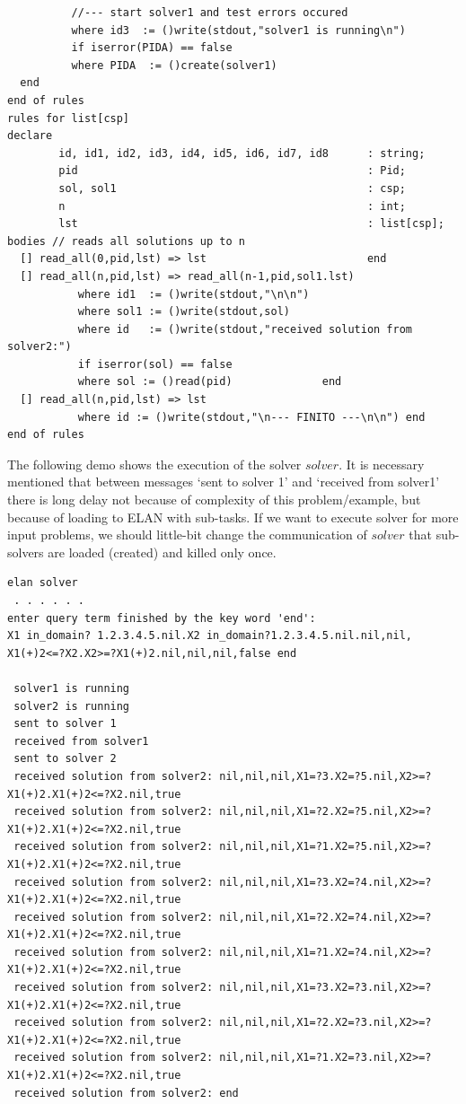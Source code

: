 \documentclass{article}
\begin{document}
{{\begin{verbatim}
          //--- start solver1 and test errors occured
          where id3  := ()write(stdout,"solver1 is running\n")
          if iserror(PIDA) == false 
          where PIDA  := ()create(solver1)              
  end
end of rules
rules for list[csp]
declare 
        id, id1, id2, id3, id4, id5, id6, id7, id8      : string;
        pid                                             : Pid;
        sol, sol1                                       : csp;
        n                                               : int;
        lst                                             : list[csp];
bodies // reads all solutions up to n
  [] read_all(0,pid,lst) => lst                         end
  [] read_all(n,pid,lst) => read_all(n-1,pid,sol1.lst)
           where id1  := ()write(stdout,"\n\n")
           where sol1 := ()write(stdout,sol)
           where id   := ()write(stdout,"received solution from solver2:")
           if iserror(sol) == false
           where sol := ()read(pid)              end
  [] read_all(n,pid,lst) => lst
           where id := ()write(stdout,"\n--- FINITO ---\n\n") end
end of rules
\end{verbatim}
}
%
The following demo shows the execution of the solver $solver$. It is
necessary mentioned that between messages `sent to solver 1' and
`received from solver1' there is long delay  not because of
complexity of this problem/example, but because of loading to ELAN
with sub-tasks. If we want to execute solver for more input problems,
we should little-bit change the communication of $solver$ that
sub-solvers are loaded (created) and killed only once.
{\scriptsize
\begin{verbatim}
elan solver
 . . . . . .
enter query term finished by the key word 'end':
X1 in_domain? 1.2.3.4.5.nil.X2 in_domain?1.2.3.4.5.nil.nil,nil,
X1(+)2<=?X2.X2>=?X1(+)2.nil,nil,nil,false end

 solver1 is running 
 solver2 is running 
 sent to solver 1
 received from solver1 
 sent to solver 2
 received solution from solver2: nil,nil,nil,X1=?3.X2=?5.nil,X2>=?X1(+)2.X1(+)2<=?X2.nil,true 
 received solution from solver2: nil,nil,nil,X1=?2.X2=?5.nil,X2>=?X1(+)2.X1(+)2<=?X2.nil,true 
 received solution from solver2: nil,nil,nil,X1=?1.X2=?5.nil,X2>=?X1(+)2.X1(+)2<=?X2.nil,true 
 received solution from solver2: nil,nil,nil,X1=?3.X2=?4.nil,X2>=?X1(+)2.X1(+)2<=?X2.nil,true 
 received solution from solver2: nil,nil,nil,X1=?2.X2=?4.nil,X2>=?X1(+)2.X1(+)2<=?X2.nil,true 
 received solution from solver2: nil,nil,nil,X1=?1.X2=?4.nil,X2>=?X1(+)2.X1(+)2<=?X2.nil,true 
 received solution from solver2: nil,nil,nil,X1=?3.X2=?3.nil,X2>=?X1(+)2.X1(+)2<=?X2.nil,true 
 received solution from solver2: nil,nil,nil,X1=?2.X2=?3.nil,X2>=?X1(+)2.X1(+)2<=?X2.nil,true 
 received solution from solver2: nil,nil,nil,X1=?1.X2=?3.nil,X2>=?X1(+)2.X1(+)2<=?X2.nil,true 
 received solution from solver2: end 
\end{verbatim}
}

}
\end{document}
